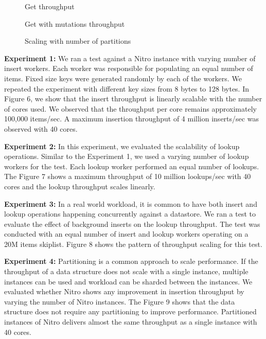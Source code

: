 \documentclass{vldb}
\begin{document}
\begin{figure}[h]

\caption{Get throughput}
\label{fig:throughput-threads}
\end{figure}

 \begin{figure}[h]

\caption{Get with mutations throughput}
\label{fig:throughput-threads}
\end{figure}

\begin{figure}[h]

\caption{Scaling with number of partitions}
\label{fig:throughput-threads}
\end{figure}


\textbf{Experiment 1:} We ran a test against a Nitro instance with varying number of insert workers. Each worker was responsible for populating an equal number of items. Fixed size keys were generated randomly by each of the workers. We repeated the experiment with different key sizes from 8 bytes to 128 bytes. In Figure 6, we show that the insert throughput is linearly scalable with the number of cores used. We observed that the throughput per core remains approximately 100,000 items/sec. A maximum insertion throughput of 4 million inserts/sec was observed with 40 cores.

\textbf{Experiment 2:} In this experiment, we evaluated the scalability of lookup operations. Similar to the Experiment 1, we used a varying number of lookup workers for the test. Each lookup worker performed an equal number of lookups.
The Figure 7 shows a maximum throughput of 10 million lookups/sec with 40 cores and the lookup throughput scales linearly.


\textbf{Experiment 3:} In a real world workload, it is common to have both insert and lookup operations happening concurrently against a datastore. We ran a test to evaluate the effect of background inserts on the lookup throughput. The test was conducted with an equal number of insert and lookup workers operating on a 20M items skiplist. Figure 8 shows the pattern of throughput scaling for this test.


\textbf{Experiment 4:} Partitioning is a common approach to scale performance. If the throughput of a data structure does not scale with a single instance, multiple instances can be used and workload can be sharded between the instances. We evaluated whether Nitro shows any improvement in insertion throughput by varying the number of Nitro instances. The Figure 9 shows that the data structure does not require any partitioning to improve performance. Partitioned instances of Nitro delivers almost the same throughput as a single instance with 40 cores.
\end{document}
